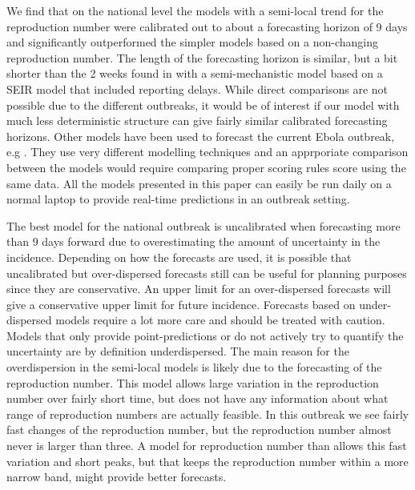 \documentclass[12pt]{article}
\begin{document}
We find that on the national level the models with a semi-local trend for the reproduction number were calibrated out to about a forecasting horizon of 9 days and significantly outperformed the simpler models based on a non-changing reproduction number. The length of the forecasting horizon is similar, but a bit shorter than the 2 weeks found in \cite{funkAssessingPerformanceRealtime2019} with a semi-mechanistic model based on a SEIR model that included reporting delays. While direct comparisons are not possible due to the different outbreaks, it would be of interest if our model with much less deterministic structure can give fairly similar calibrated forecasting horizons. Other models have been used to forecast the current Ebola outbreak, e.g \cite{kellyRealtimePredictions201820192019, akhmetzhanovAnalyzingForecastingEbola2019}. They use very different modelling techniques and an apprporiate comparison between the models would require comparing proper scoring rules score using the same data. All the models presented in this paper can easily be run daily on a normal laptop to provide real-time predictions in an outbreak setting. 


The best model for the national outbreak is uncalibrated when forecasting more than 9 days forward due to overestimating the amount of uncertainty in the incidence. Depending on how the forecasts are used, it is possible that uncalibrated but over-dispersed forecasts still can be useful for planning purposes since they are conservative. An upper limit for an over-dispersed forecasts will give a conservative upper limit for future incidence. Forecasts based on under-dispersed models require a lot more care and should be treated with caution. Models that only provide point-predictions or do not actively try to quantify the uncertainty are by definition underdispersed. The main reason for the overdispersion in the semi-local models is likely due to the forecasting of the reproduction number. This model allows large variation in the reproduction number over fairly short time, but does not have any information about what range of reproduction numbers are actually feasible. In this outbreak we see fairly fast changes of the reproduction number, but the reproduction number almost never is larger than three. A model for reproduction number than allows this fast variation and short peaks, but that keeps the reproduction number within a more narrow band, might provide better forecasts.
\end{document}
